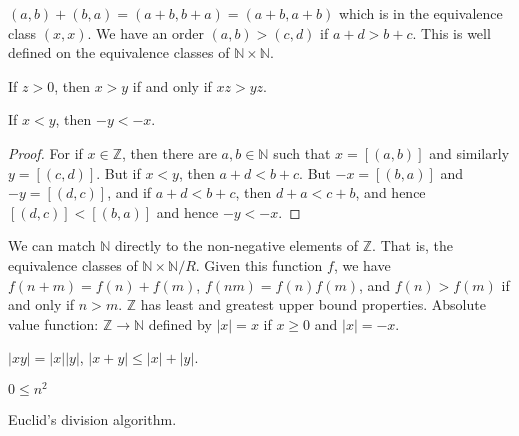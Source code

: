         $(a,b)+(b,a)=(a+b,b+a)=(a+b,a+b)$ which is in the equivalence class
        $(x,x)$. We have an order $(a,b)>(c,d)$ if $a+d>b+c$. This is well
        defined on the equivalence classes of $\mathbb{N}\times\mathbb{N}$.
        \begin{theorem}
            If $z>0$, then $x>y$ if and only if $xz>yz$.
        \end{theorem}
        \begin{theorem}
            If $x<y$, then $\minus{y}<\minus{x}$.
        \end{theorem}
        \begin{proof}
            For if $x\in\mathbb{Z}$, then there are $a,b\in\mathbb{N}$ such
            that $x=[(a,b)]$ and similarly $y=[(c,d)]$. But if
            $x<y$, then $a+d<b+c$. But $\minus{x}=[(b,a)]$ and
            $\minus{y}=[(d,c)]$, and if $a+d<b+c$, then $d+a<c+b$, and hence
            $[(d,c)]<[(b,a)]$ and hence $\minus{y}<\minus{x}$.
        \end{proof}
        We can match $\mathbb{N}$ directly to the non-negative elements of
        $\mathbb{Z}$. That is, the equivalence classes of
        $\mathbb{N}\times\mathbb{N}/R$. Given this function $f$, we have
        $f(n+m)=f(n)+f(m)$, $f(nm)=f(n)f(m)$, and $f(n)>f(m)$ if and only if
        $n>m$. $\mathbb{Z}$ has least and greatest upper bound properties.
        Absolute value function: $\mathbb{Z}\rightarrow\mathbb{N}$ defined
        by $|x|=x$ if $x\geq{0}$ and $|x|=\minus{x}$.
        \begin{theorem}
            $|xy|=|x||y|$, $|x+y|\leq|x|+|y|$.
        \end{theorem}
        \begin{theorem}
            $0\leq{n}^{2}$
        \end{theorem}
        Euclid's division algorithm.
